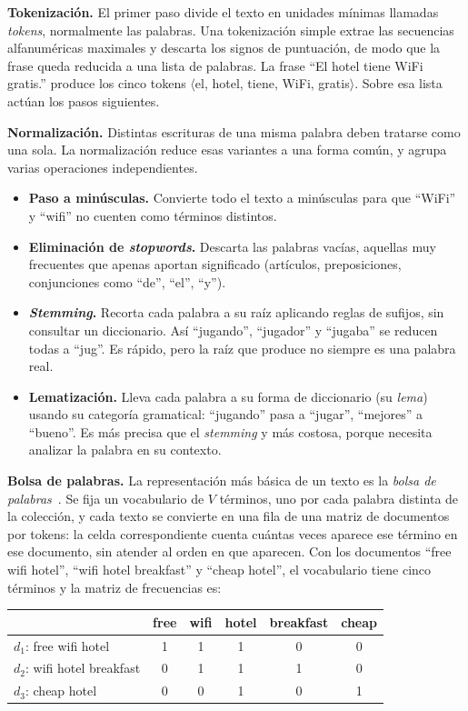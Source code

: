 \documentclass[12pt,a4paper]{report}
\theoremstyle{definition}
\begin{document}
\medskip
\noindent\textbf{Tokenización.} El primer paso divide el texto en unidades mínimas llamadas
\emph{tokens}, normalmente las palabras. Una tokenización simple extrae las secuencias alfanuméricas
maximales y descarta los signos de puntuación, de modo que la frase queda reducida a una lista de
palabras. La frase ``El hotel tiene WiFi gratis.'' produce los cinco tokens
$\langle$el, hotel, tiene, WiFi, gratis$\rangle$. Sobre esa lista actúan los pasos siguientes.

\medskip
\noindent\textbf{Normalización.} Distintas escrituras de una misma palabra deben tratarse como una
sola. La normalización reduce esas variantes a una forma común, y agrupa varias operaciones
independientes.

\begin{itemize}
\item \textbf{Paso a minúsculas.} Convierte todo el texto a minúsculas para que ``WiFi'' y ``wifi'' no
cuenten como términos distintos.
\item \textbf{Eliminación de \emph{stopwords}.} Descarta las palabras vacías, aquellas muy frecuentes
que apenas aportan significado (artículos, preposiciones, conjunciones como ``de'', ``el'', ``y''). 
\item \textbf{\emph{Stemming}.} Recorta cada palabra a su raíz aplicando reglas de sufijos, sin
consultar un diccionario. Así ``jugando'', ``jugador'' y ``jugaba'' se reducen todas a ``jug''. Es
rápido, pero la raíz que produce no siempre es una palabra real.
\item \textbf{Lematización.} Lleva cada palabra a su forma de diccionario (su \emph{lema}) usando su
categoría gramatical: ``jugando'' pasa a ``jugar'', ``mejores'' a ``bueno''. Es más precisa que el
\emph{stemming} y más costosa, porque necesita analizar la palabra en su contexto.
\end{itemize}

\medskip
\noindent\textbf{Bolsa de palabras.} La representación más básica de un texto es la \emph{bolsa de
palabras}~\cite{harris1954distributional}. Se fija un vocabulario de $V$ términos, uno por cada palabra
distinta de la colección, y cada texto se convierte en una fila de una matriz de documentos por
tokens: la celda correspondiente cuenta cuántas veces aparece ese término en ese documento, sin atender
al orden en que aparecen. Con los documentos ``free wifi hotel'', ``wifi hotel breakfast'' y ``cheap
hotel'', el vocabulario tiene cinco términos y la matriz de frecuencias es:

\begin{center}
\begin{tabular}{lccccc}
\toprule
 & free & wifi & hotel & breakfast & cheap \\
\midrule
$d_1$: free wifi hotel      & 1 & 1 & 1 & 0 & 0 \\
$d_2$: wifi hotel breakfast & 0 & 1 & 1 & 1 & 0 \\
$d_3$: cheap hotel          & 0 & 0 & 1 & 0 & 1 \\
\bottomrule
\end{tabular}
\end{center}
\end{document}
